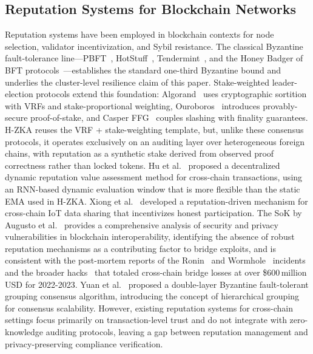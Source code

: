 \documentclass[journal]{IEEEtran}
\begin{document}
\subsection{Reputation Systems for Blockchain Networks}

Reputation systems have been employed in blockchain contexts for node selection, validator incentivization, and Sybil resistance. The classical Byzantine fault-tolerance line---PBFT~\cite{castro1999pbft}, HotStuff~\cite{yin2019hotstuff}, Tendermint~\cite{kwon2014tendermint}, and the Honey Badger of BFT protocols~\cite{miller2016honeybadger}---establishes the standard one-third Byzantine bound and underlies the cluster-level resilience claim of this paper. Stake-weighted leader-election protocols extend this foundation: Algorand~\cite{chen2017algorand} uses cryptographic sortition with VRFs and stake-proportional weighting, Ouroboros~\cite{kiayias2017ouroboros} introduces provably-secure proof-of-stake, and Casper FFG~\cite{buterin2017casper} couples slashing with finality guarantees. H-ZKA reuses the VRF + stake-weighting template, but, unlike these consensus protocols, it operates exclusively on an {auditing} layer over heterogeneous foreign chains, with reputation as a synthetic stake derived from observed proof correctness rather than locked tokens. Hu et al.~\cite{hu2024reputation} proposed a decentralized dynamic reputation value assessment method for cross-chain transactions, using an RNN-based dynamic evaluation window that is more flexible than the static EMA used in H-ZKA. Xiong et al.~\cite{xiong2025reputation} developed a reputation-driven mechanism for cross-chain IoT data sharing that incentivizes honest participation. The SoK by Augusto et al.~\cite{augusto2024sok} provides a comprehensive analysis of security and privacy vulnerabilities in blockchain interoperability, identifying the absence of robust reputation mechanisms as a contributing factor to bridge exploits, and is consistent with the post-mortem reports of the Ronin~\cite{ronin2022postmortem} and Wormhole~\cite{wormhole2022postmortem} incidents and the broader hacks~\cite{crosschainbridgehack2023} that totaled cross-chain bridge losses at over \$600\,million USD for 2022-2023. Yuan et al.~\cite{yuan2024doublelayer} proposed a double-layer Byzantine fault-tolerant grouping consensus algorithm, introducing the concept of hierarchical grouping for consensus scalability. However, existing reputation systems for cross-chain settings focus primarily on transaction-level trust and do not integrate with zero-knowledge auditing protocols, leaving a gap between reputation management and privacy-preserving compliance verification.
\end{document}
